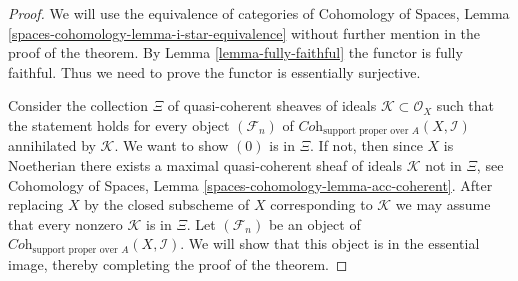 \documentclass[10pt,a4paper]{amsart}
\theoremstyle{plain}
\theoremstyle{definition}
\theoremstyle{remark}
\numberwithin{equation}{subsection}
\begin{document}
\begin{proof}
We will use the equivalence of categories of
Cohomology of Spaces, Lemma \ref{spaces-cohomology-lemma-i-star-equivalence}
without further mention in the proof of the theorem.
By Lemma \ref{lemma-fully-faithful} the functor is fully faithful.
Thus we need to prove the functor is essentially surjective.

\medskip\noindent
Consider the collection $\Xi$ of quasi-coherent sheaves of ideals
$\mathcal{K} \subset \mathcal{O}_X$ such that the statement holds
for every object $(\mathcal{F}_n)$ of
$\textit{Coh}_{\text{support proper over }A}(X, \mathcal{I})$
annihilated by $\mathcal{K}$. We want to show $(0)$ is in $\Xi$.
If not, then since $X$ is Noetherian there exists a maximal
quasi-coherent sheaf of ideals $\mathcal{K}$ not in $\Xi$, see
Cohomology of Spaces, Lemma \ref{spaces-cohomology-lemma-acc-coherent}.
After replacing $X$ by the closed subscheme of $X$
corresponding to $\mathcal{K}$ we may assume that every nonzero
$\mathcal{K}$ is in $\Xi$. Let $(\mathcal{F}_n)$ be an object of
$\textit{Coh}_{\text{support proper over }A}(X, \mathcal{I})$.
We will show that this object is in the essential image, thereby
completing the proof of the theorem.


\end{proof}
\end{document}

